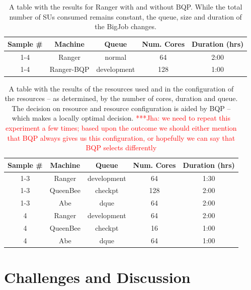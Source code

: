 \documentclass[conference,final]{IEEEtran}
\newcommand{\jhanote}[1]{ {\textcolor{red} { ***Jha: #1 }}}
\newcommand{\jhanote}[1]{}
\begin{document}
\begin{table}
\begin{tabular}{|c|c|c|c|c|}
\hline Sample \# & Machine & Queue & Num. Cores & Duration (hrs) \\ 
\hline 1-4& Ranger & normal & 64 & 2:00 \\ 
\hline 1-4& Ranger-BQP & development & 128 & 1:00 \\ 
\hline 
\end{tabular} 
\caption{A table with the results for Ranger with and without BQP. While the
  total number of SUs consumed remains constant, the queue, size and duration
  of the BigJob changes. }
\end{table}


\begin{table}
\begin{tabular}{|c|c|c|c|c|}
\hline Sample \# & Machine & Queue & Num. Cores & Duration (hrs) \\ 
\hline 1-3 & Ranger & development & 64 & 1:30 \\ 
\hline 1-3 & QueenBee & checkpt & 128 & 2:00 \\ 
\hline 1-3 & Abe & dque & 64 & 2:00 \\ 
\hline 4 & Ranger & development & 64 & 2:00 \\ 
\hline 4 & QueenBee & checkpt & 16 & 1:00 \\ 
\hline 4 & Abe & dque & 64 & 1:00 \\ 
\hline 
\end{tabular} 
\caption{A table with the results of the resources used and in
  the configuration of the resources -- as determined, by the
  number of cores, duration and queue. The decision on
  resource and resource configuration is aided by BQP -- which 
  makes a locally optimal decision. \jhanote{we need to repeat
    this experiment a few times; based upon the outcome we should either
    mention that BQP always gives us this configuration, or hopefully we
    can say that BQP selects differently}}
\end{table}



\section{Challenges and Discussion}
\end{document}
